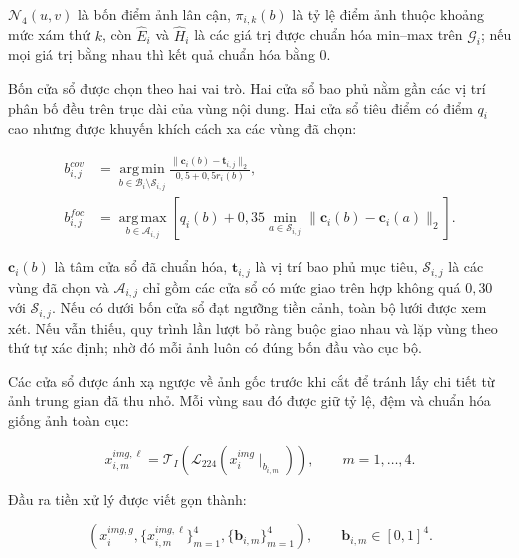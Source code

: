 $\mathcal{N}_4(u,v)$ là bốn điểm ảnh lân cận, $\pi_{i,k}(b)$ là tỷ lệ điểm ảnh thuộc khoảng mức xám thứ $k$, còn $\widehat{E}_i$ và $\widehat{H}_i$ là các giá trị được chuẩn hóa min--max trên $\mathcal{G}_i$; nếu mọi giá trị bằng nhau thì kết quả chuẩn hóa bằng $0$.

Bốn cửa sổ được chọn theo hai vai trò. Hai cửa sổ bao phủ nằm gần các vị trí phân bố đều trên trục dài của vùng nội dung. Hai cửa sổ tiêu điểm có điểm $q_i$ cao nhưng được khuyến khích cách xa các vùng đã chọn:

\begin{equation}
\begin{aligned}
b_{i,j}^{cov}
&=\underset{b\in\mathcal{B}_i\setminus\mathcal{S}_{i,j}}
{\operatorname{arg\,min}}
\frac{\|\boldsymbol{c}_i(b)-\boldsymbol{t}_{i,j}\|_2}
{0{,}5+0{,}5r_i(b)},\\
b_{i,j}^{foc}
&=\underset{b\in\mathcal{A}_{i,j}}
{\operatorname{arg\,max}}
\left[q_i(b)+0{,}35
\min_{a\in\mathcal{S}_{i,j}}
\|\boldsymbol{c}_i(b)-\boldsymbol{c}_i(a)\|_2\right].
\end{aligned}
\label{eq:ch3_region_selection}
\end{equation}

$\boldsymbol{c}_i(b)$ là tâm cửa sổ đã chuẩn hóa, $\boldsymbol{t}_{i,j}$ là vị trí bao phủ mục tiêu, $\mathcal{S}_{i,j}$ là các vùng đã chọn và $\mathcal{A}_{i,j}$ chỉ gồm các cửa sổ có mức giao trên hợp không quá $0{,}30$ với $\mathcal{S}_{i,j}$. Nếu có dưới bốn cửa sổ đạt ngưỡng tiền cảnh, toàn bộ lưới được xem xét. Nếu vẫn thiếu, quy trình lần lượt bỏ ràng buộc giao nhau và lặp vùng theo thứ tự xác định; nhờ đó mỗi ảnh luôn có đúng bốn đầu vào cục bộ.

Các cửa sổ được ánh xạ ngược về ảnh gốc trước khi cắt để tránh lấy chi tiết từ ảnh trung gian đã thu nhỏ. Mỗi vùng sau đó được giữ tỷ lệ, đệm và chuẩn hóa giống ảnh toàn cục:

\begin{equation}
x_{i,m}^{img,\ell}
=\mathcal{T}_{I}\!\left(
\mathcal{L}_{224}\!\left(x_i^{img}\!\mid_{b_{i,m}}\right)
\right),
\qquad m=1,\ldots,4.
\label{eq:ch3_local_images}
\end{equation}

Đầu ra tiền xử lý được viết gọn thành:

\begin{equation}
\left(
x_i^{img,g},
\{x_{i,m}^{img,\ell}\}_{m=1}^{4},
\{\boldsymbol{b}_{i,m}\}_{m=1}^{4}
\right),
\qquad
\boldsymbol{b}_{i,m}\in[0,1]^4.
\label{eq:ch3_preprocessing_output}
\end{equation}


